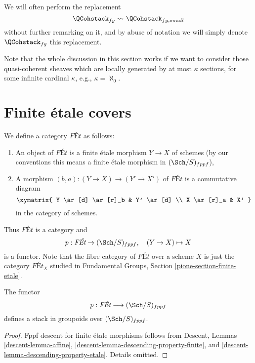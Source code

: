 \noindent
We will often perform the replacement
$$
\QCohstack_{fg} \leadsto \QCohstack_{fg, small}
$$
without further remarking on it, and by abuse of notation we will
simply denote $\QCohstack_{fg}$ this replacement.

\begin{remark}
\label{remark-higher-rank}
Note that the whole discussion in this section works
if we want to consider those
quasi-coherent sheaves which are locally generated by at most $\kappa$
sections, for some infinite cardinal $\kappa$, e.g., $\kappa = \aleph_0$.
\end{remark}





\section{Finite \'etale covers}
\label{section-finite-etale}

\noindent
We define a category $\textit{F\'Et}$ as follows:
\begin{enumerate}
\item An object of $\textit{F\'Et}$ is a finite \'etale morphism $Y \to X$
of schemes (by our conventions this means a finite \'etale morphism
in $(\Sch/S)_{fppf}$),
\item A morphism $(b, a) : (Y \to X) \to (Y' \to X')$ of $\textit{F\'Et}$
is a commutative diagram
$$
\xymatrix{
Y \ar[d] \ar[r]_b & Y' \ar[d] \\
X \ar[r]_a & X'
}
$$
in the category of schemes.
\end{enumerate}
Thus $\textit{F\'Et}$ is a category and
$$
p : \textit{F\'Et} \to (\Sch/S)_{fppf},
\quad
(Y \to X) \mapsto X
$$
is a functor. Note that the fibre category of $\textit{F\'Et}$ over
a scheme $X$ is just the category $\textit{F\'Et}_X$ studied in
Fundamental Groups, Section \ref{pione-section-finite-etale}.

\begin{lemma}
\label{lemma-finite-etale-stack}
The functor
$$
p : \textit{F\'Et} \longrightarrow (\Sch/S)_{fppf}
$$
defines a stack in groupoids over $(\Sch/S)_{fppf}$.
\end{lemma}

\begin{proof}
Fppf descent for finite \'etale morphisms follows from
Descent, Lemmas \ref{descent-lemma-affine},
\ref{descent-lemma-descending-property-finite}, and
\ref{descent-lemma-descending-property-etale}.
Details omitted.
\end{proof}






